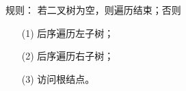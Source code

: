 %
%
\begin{frame}
\textcolor{acolor5}{规则：}
若二叉树为空，则遍历结束；否则
\begin{itemize}
\item[(1)] 后序遍历左子树；
\item[(2)] 后序遍历右子树；
\item[(3)] 访问根结点。
\end{itemize}
\end{frame}
%
\begin{frame}[fragile]
\begin{figure}
\centering

\end{figure} 
\end{frame}
%
%
%
\begin{frame}


\end{frame}
%
%
%

